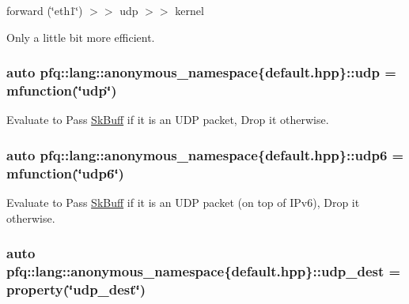 forward (\char`\"{}eth1\char`\"{}) $>$$>$ udp $>$$>$ kernel

Only a little bit more efficient. \hypertarget{namespacepfq_1_1lang_1_1anonymous__namespace_02default_8hpp_03_a0b8b927aad3be7034521ebde0dabf7d3}{
\subsubsection[{udp}]{\setlength{\rightskip}{0pt plus 5cm}auto pfq\+::lang\+::anonymous\+\_\+namespace\{default.\+hpp\}\+::udp = {\bf mfunction}(\char`\"{}udp\char`\"{})}}\label{namespacepfq_1_1lang_1_1anonymous__namespace_02default_8hpp_03_a0b8b927aad3be7034521ebde0dabf7d3}


Evaluate to {\ttfamily Pass} \hyperlink{structpfq_1_1lang_1_1SkBuff}{Sk\+Buff} if it is an U\+D\+P packet, {\ttfamily Drop} it otherwise. 

\hypertarget{namespacepfq_1_1lang_1_1anonymous__namespace_02default_8hpp_03_a37f7f4eb5cff8508b956eba7dee75a45}{
\subsubsection[{udp6}]{\setlength{\rightskip}{0pt plus 5cm}auto pfq\+::lang\+::anonymous\+\_\+namespace\{default.\+hpp\}\+::udp6 = {\bf mfunction}(\char`\"{}udp6\char`\"{})}}\label{namespacepfq_1_1lang_1_1anonymous__namespace_02default_8hpp_03_a37f7f4eb5cff8508b956eba7dee75a45}


Evaluate to {\ttfamily Pass} \hyperlink{structpfq_1_1lang_1_1SkBuff}{Sk\+Buff} if it is an U\+D\+P packet (on top of I\+Pv6), {\ttfamily Drop} it otherwise. 

\hypertarget{namespacepfq_1_1lang_1_1anonymous__namespace_02default_8hpp_03_a7c15d9ec0af24b9515acc8a04b7b1e2e}{
\subsubsection[{udp\+\_\+dest}]{\setlength{\rightskip}{0pt plus 5cm}auto pfq\+::lang\+::anonymous\+\_\+namespace\{default.\+hpp\}\+::udp\+\_\+dest = {\bf property}(\char`\"{}udp\+\_\+dest\char`\"{})}}\label{namespacepfq_1_1lang_1_1anonymous__namespace_02default_8hpp_03_a7c15d9ec0af24b9515acc8a04b7b1e2e}


